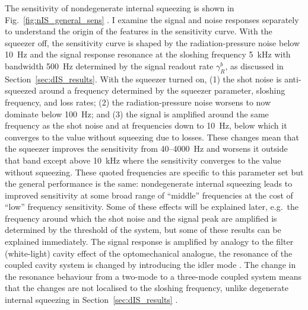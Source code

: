 The sensitivity of nondegenerate internal squeezing is shown in Fig.~\ref{fig:nIS_general_sens} . I examine the signal and noise responses separately to understand the origin of the features in the sensitivity curve.
With the squeezer off, the sensitivity curve is shaped by the radiation-pressure noise below 10~Hz and the signal response resonance at the sloshing frequency 5~kHz with bandwidth 500~Hz determined by the signal readout rate $\gamma^b_R$, as discussed in Section~\ref{sec:dIS_results}. With the squeezer turned on, (1) the shot noise is anti-squeezed around a frequency determined by the squeezer parameter, sloshing frequency, and loss rates; (2) the radiation-pressure noise worsens to now dominate below 100~Hz; and (3) the signal is amplified around the same frequency as the shot noise and at frequencies down to 10~Hz, below which it converges to the value without squeezing due to losses. These changes mean that the squeezer improves the sensitivity from 40--4000~Hz and worsens it outside that band except above 10~kHz where the sensitivity converges to the value without squeezing.
These quoted frequencies are specific to this parameter set but the general performance is the same: nondegenerate internal squeezing leads to improved sensitivity at some broad range of ``middle'' frequencies at the cost of ``low'' frequency sensitivity. 
Some of these effects will be explained later, e.g.\ the frequency around which the shot noise and the signal peak are amplified is determined by the threshold of the system, but some of these results can be explained immediately.
The signal response is amplified by analogy to the filter (white-light) cavity effect of the optomechanical analogue, the resonance of the coupled cavity system is changed by introducing the idler mode . The change in the resonance behaviour from a two-mode to a three-mode coupled system means that the changes are not localised to the sloshing frequency, unlike degenerate internal squeezing in Section~\ref{sec:dIS_results} . 
